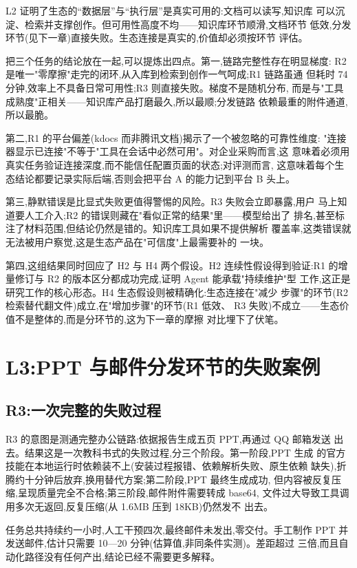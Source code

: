 \documentclass[
  12pt,
  a4paper,
  oneside,
  headings=normal,
  numbers=noendperiod,
  listof=totoc,
  bibliography=totoc
]{scrreprt}
\begin{document}
L2 证明了生态的“数据层”与“执行层”是真实可用的:文档可以读写,知识库
可以沉淀、检索并支撑创作。但可用性高度不均——知识库环节顺滑,文档环节
低效,分发环节(见下一章)直接失败。生态连接是真实的,价值却必须按环节
评估。

把三个任务的结论放在一起,可以提炼出四点。第一,链路完整性存在明显梯度:
R2 是唯一"零摩擦"走完的闭环,从入库到检索到创作一气呵成;R1 链路虽通
但耗时 74 分钟,效率上不具备日常可用性;R3 则直接失败。梯度不是随机分布,
而是与"工具成熟度"正相关——知识库产品打磨最久,所以最顺;分发链路
依赖最重的附件通道,所以最脆。

第二,R1 的平台偏差(kdocs 而非腾讯文档)揭示了一个被忽略的可靠性维度:
"连接器显示已连接"不等于"工具在会话中必然可用"。对企业采购而言,这
意味着必须用真实任务验证连接深度,而不能信任配置页面的状态;对评测而言,
这意味着每个生态结论都要记录实际后端,否则会把平台 A 的能力记到平台 B
头上。

第三,静默错误是比显式失败更值得警惕的风险。R3 失败会立即暴露,用户
马上知道要人工介入;R2 的错误则藏在"看似正常的结果"里——模型给出了
排名,甚至标注了材料范围,但结论仍然是错的。知识库工具如果不提供解析
覆盖率,这类错误就无法被用户察觉,这是生态产品在"可信度"上最需要补的
一块。

第四,这组结果同时回应了 H2 与 H4 两个假设。H2 连续性假设得到验证:R1
的增量修订与 R2 的版本区分都成功完成,证明 Agent 能承载"持续维护"型
工作,这正是研究工作的核心形态。H4 生态假设则被精确化:生态连接在"减少
步骤"的环节(R2 检索替代翻文件)成立,在"增加步骤"的环节(R1 低效、
R3 失败)不成立——生态价值不是整体的,而是分环节的,这为下一章的摩擦
对比埋下了伏笔。

\chapter{L3:PPT 与邮件分发环节的失败案例}

\section{R3:一次完整的失败过程}

R3 的意图是测通完整办公链路:依据报告生成五页 PPT,再通过 QQ 邮箱发送
出去。结果这是一次教科书式的失败过程,分三个阶段。第一阶段,PPT 生成
的官方技能在本地运行时依赖装不上(安装过程报错、依赖解析失败、原生依赖
缺失),折腾约十分钟后放弃,换用替代方案;第二阶段,PPT 最终生成成功,
但内容被反复压缩,呈现质量完全不合格;第三阶段,邮件附件需要转成 base64,
文件过大导致工具调用多次无返回,反复压缩(从 1.6MB 压到 18KB)仍然发不
出去。

任务总共持续约一小时,人工干预四次,最终邮件未发出,零交付。手工制作
PPT 并发送邮件,估计只需要 10—20 分钟(估算值,非同条件实测)。差距超过
三倍,而且自动化路径没有任何产出,结论已经不需要更多解释。
\end{document}
